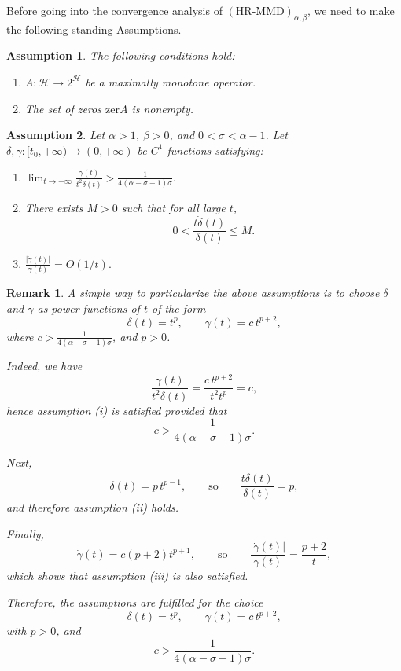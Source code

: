 \documentclass[11pt]{article}
\numberwithin{equation}{section}
\newtheorem{remark}{Remark}[section]
\newtheorem{Assumption}{Assumption}[section]
\begin{document}
Before going into the convergence analysis of $(\text{HR-MMD})_{\alpha,\beta}$, we need to make the following standing Assumptions.
\begin{Assumption}\label{ass:C}
The following conditions hold:
\begin{enumerate}[label=(\roman*)]
    \item $A : \mathcal{H}\to 2^{\mathcal{H}}$ be a maximally monotone operator.
    \item The set of zeros $\text{zer}A$ is nonempty. 
\end{enumerate}
\end{Assumption}
\begin{Assumption}\label{ass:D}
Let $\alpha > 1$, $\beta>0$, and $0<\sigma<\alpha-1$.  
Let $\delta,\gamma:[t_0,+\infty)\to(0,+\infty)$ be $C^1$ functions satisfying:

\begin{enumerate}[label=(\roman*)]
    \item $\displaystyle\lim_{t\to +\infty}\frac{\gamma(t)}{t^2\delta(t)}>\frac{1}{4(\alpha-\sigma-1)\sigma}.$
    \item 
    There exists $M>0$ such that for all large $t$,
    \[
    0 < \frac{t\dot{\delta}(t)}{\delta(t)} \le M.
    \]
    \item 
    $\displaystyle \frac{\vert\dot{\gamma}(t)\vert}{\gamma(t)} = O(1/t).$
\end{enumerate}
\end{Assumption}
\begin{remark}
A simple way to particularize the above assumptions is to choose $\delta$ and $\gamma$ as power functions of $t$ of the form
\[
\delta(t)=t^p,
\qquad
\gamma(t)=c\,t^{p+2},
\]
where $c>\frac{1}{4(\alpha-\sigma-1)\sigma}$, and $p>0$.

Indeed, we have
\[
\frac{\gamma(t)}{t^2\delta(t)}
=
\frac{c\,t^{p+2}}{t^2 t^p}
=c,
\]
hence assumption {\rm(i)} is satisfied provided that
\[
c>\frac{1}{4(\alpha-\sigma-1)\sigma}.
\]

Next,
\[
\dot\delta(t)=p\,t^{p-1},
\qquad\text{so}\qquad
\frac{t\dot\delta(t)}{\delta(t)}=p,
\]
and therefore assumption {\rm(ii)} holds.

Finally,
\[
\dot\gamma(t)=c(p+2)t^{p+1},
\qquad\text{so}\qquad
\frac{|\dot\gamma(t)|}{\gamma(t)}=\frac{p+2}{t},
\]
which shows that assumption {\rm(iii)} is also satisfied.

Therefore, the assumptions are fulfilled for the choice
\[
\delta(t)=t^p,
\qquad
\gamma(t)=c\,t^{p+2},
\]
with $p>0$, and
\[
c>\frac{1}{4(\alpha-\sigma-1)\sigma}.
\]
\end{remark}
\end{document}
